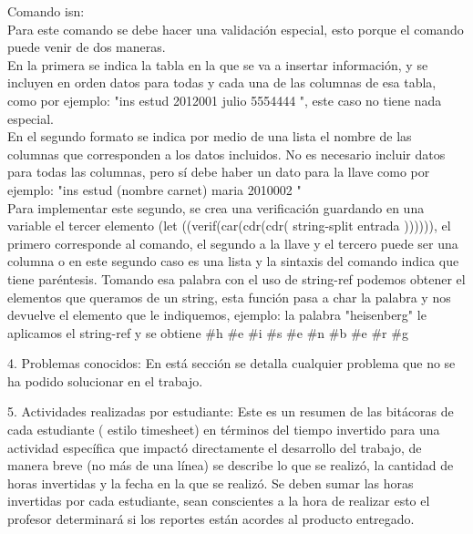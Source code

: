 \documentclass[12pt,a4paper]{report}
\begin{document}
\begin{flushleft}
Comando isn:\\
Para este comando se debe hacer una validación especial, esto porque el comando puede venir de dos maneras.\\
En la primera se indica la tabla en la que se va a insertar información, y se incluyen en orden datos para todas y cada una de las columnas de esa tabla, como por ejemplo:
"ins estud 2012001 julio 5554444 ", este caso no tiene nada especial.\\
En el segundo formato se indica por medio de una lista el nombre de las columnas que corresponden a los datos incluidos. No es necesario incluir datos para todas las
columnas, pero sí debe haber un dato para la llave como por ejemplo: "ins estud (nombre carnet) maria 2010002 "\\
Para implementar este segundo, se crea una verificación guardando en una variable el tercer elemento (let ((verif(car(cdr(cdr( string-split entrada )))))), el primero corresponde al comando, el segundo a la llave y el tercero puede ser una columna o en este segundo caso es una lista y la sintaxis del comando indica que tiene paréntesis. Tomando esa palabra con el uso de string-ref podemos obtener el elementos que queramos de un string, esta función pasa a char la palabra y nos devuelve el elemento que le indiquemos, ejemplo: la palabra "heisenberg" le aplicamos el string-ref y se obtiene $\#$h $\#$e $\#$i $\#$s $\#$e $\#$n $\#$b $\#$e $\#$r $\#$g




\end{flushleft}

\begin{flushleft}

4. Problemas conocidos: En está sección se detalla cualquier problema que no se ha podido solucionar en el trabajo.

\end{flushleft}

\begin{flushleft}
5. Actividades realizadas por estudiante: Este es un resumen de las bitácoras
de cada estudiante ( estilo timesheet) en términos del tiempo invertido para
una actividad específica que impactó directamente el desarrollo del trabajo,
de manera breve (no más de una línea) se describe lo que se realizó, la
cantidad de horas invertidas y la fecha en la que se realizó. Se deben sumar
las horas invertidas por cada estudiante, sean conscientes a la hora de
realizar esto el profesor determinará si los reportes están acordes al
producto entregado.

\end{flushleft}
\end{document}
